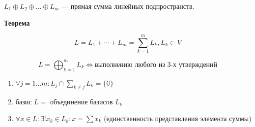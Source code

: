 \(L_1 \oplus L_2 \oplus \ldots \oplus L_m\) --- прямая сумма линейных подпространств.

\textbf{Теорема}

\[
    L = L_1 + \cdots + L_m = \sum\limits_{k = 1}^{m} L_k, L_k \subset V
\]

\[
    L = \bigoplus_{k = 1}^{m} L_k \Leftrightarrow \text{выполнению любого из 3-х утверждений}
\]

\begin{enumerate}
    \item \(\forall j = 1 \ldots m: L_j \cap \sum\limits_{k \neq j} L_k = \{\mathbb{0}\}\)

    \item базис \(L = \) объединение базисов \(L_k\)

    \item \(\forall x \in L: \exists! x_k \in L_k: x = \sum\limits x_k\) (единственность представления элемента суммы)
\end{enumerate}

